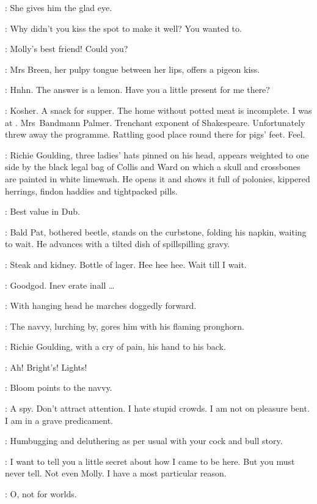 :
She gives him the glad eye.

\MrsBreen:
Why didn't you kiss the spot to make it well?
You wanted to.

\Bloom:
Molly's best friend!
Could you?

:
Mrs Breen,
her pulpy tongue between her lips,
offers a pigeon kiss.

\MrsBreen:
Hnhn.
The answer is a lemon.
Have you a little present for me there?

\Bloom:
Kosher.
A snack for supper.
The home without potted meat is incomplete.
I was at .
Mrs~Bandmann Palmer.
Trenchant exponent of Shakespeare.
Unfortunately threw away the programme.
Rattling good place round there for pigs' feet.
Feel.

:
Richie Goulding,
three ladies' hats pinned on his head,
appears weighted to one side by the black legal bag of
Collis and Ward on which a skull and crossbones are painted in white limewash.
He opens it and shows it full of polonies,
kippered herrings,
findon haddies and tightpacked pills.

\Richie:
Best value in Dub.

:
Bald Pat,
bothered beetle,
stands on the curbstone,
folding his napkin,
waiting to wait.
He advances with a tilted dish of spillspilling gravy.

\Pat:
Steak and kidney.
Bottle of lager.
Hee hee hee.
Wait till I wait.

\Richie[2]:
Goodgod.
Inev erate inall \ldots

:
With hanging head he marches doggedly forward.

:
The navvy,
lurching by,
gores him with his flaming pronghorn.

:
Richie Goulding,
with a cry of pain,
his hand to his back.

\Richie:
Ah!
Bright's!
Lights!

:
Bloom points to the navvy.

\Bloom:
A spy.
Don't attract attention.
I hate stupid crowds.
I am not on pleasure bent.
I am in a grave predicament.

\MrsBreen:
Humbugging and deluthering as per usual with your cock and bull story.

\Bloom:
I want to tell you a little secret about how I came to be here.
But you must never tell.
Not even Molly.
I have a most particular reason.

\MrsBreen:
O,
not for worlds.

